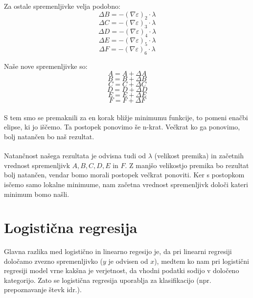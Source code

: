 \documentclass[a4paper, 12pt]{article}
\begin{document}
	Za ostale spremenljivke velja podobno:
	$$\Delta B = -(\nabla \varepsilon)_2 \cdot \lambda$$
	$$\Delta C = -(\nabla \varepsilon)_3 \cdot \lambda$$
	$$\Delta D = -(\nabla \varepsilon)_4 \cdot \lambda$$
	$$\Delta E = -(\nabla \varepsilon)_5 \cdot \lambda$$
	$$\Delta F = -(\nabla \varepsilon)_6 \cdot \lambda$$

	Naše nove spremenljivke so:
	$$ A = A + \Delta A$$
	$$ B = B + \Delta B$$
	$$ C = C + \Delta C$$
	$$ D = D + \Delta D$$
	$$ E = E + \Delta E$$
	$$ F = F + \Delta F$$

	\paragraph{}
	S tem smo se premaknili za en korak bližje minimumu funkcije, to pomeni enačbi elipse, ki jo iščemo. Ta postopek ponovimo še n-krat. Večkrat ko ga ponovimo, bolj natančen bo naš rezultat.

	\paragraph{}
	Natančnost našega rezultata je odvisna tudi od $\lambda$ (velikost premika) in začetnih vrednost spremenljivk $A, B, C, D, E$ in $F$. Z manjšo velikostjo premika bo rezultat bolj natančen, vendar bomo morali postopek večkrat ponoviti. Ker s postopkom isčemo samo lokalne minimume, nam začetna vrednost spremenljivk določi kateri minimum bomo našli.

    \section*{Logistična regresija}
    \paragraph{}
    Glavna razlika med logistično in linearno regesijo je, da pri linearni regresiji določamo zvezno spremenljivko ($y$ je odvisen od $x$), medtem ko nam pri logistični regresiji model vrne kakšna je verjetnost, da vhodni podatki sodijo v določeno kategorijo.
    Zato se logistična regresija uporablja za klasifikacijo (npr. prepoznavanje števk idr.).
\end{document}
